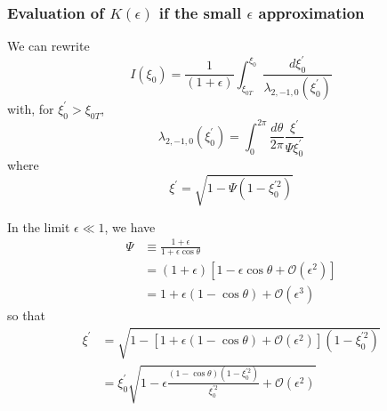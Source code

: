 
\subsubsection{Evaluation of $K\left( \epsilon \right) $ if the small $%
\epsilon $ approximation}\label{efftrappedfrac}

We can rewrite
\begin{equation}
I\left( \xi_{0}\right) =\frac{1}{\left( 1+\epsilon\right) }%
\int_{\xi_{0T}}^{\xi_{0}}\frac{d\xi_{0}^{\prime}}{\lambda_{2,-1,0}\left(
\xi_{0}^{\prime }\right) }
\end{equation}
with, for $\xi_{0}^{\prime}>\xi_{0T}$,
\begin{equation}
\lambda_{2,-1,0}\left( \xi_{0}^{\prime}\right) =\int_{0}^{2\pi}\frac
{d\theta}{2\pi}\frac{\xi^{\prime}}{\Psi\xi_{0}^{\prime}}
\end{equation}
where
\begin{equation}
\xi^{\prime}=\sqrt{1-\Psi\left( 1-\xi_{0}^{\prime2}\right) }
\end{equation}

In the limit $\epsilon\ll1$, we have
\begin{align}
\Psi & \equiv\frac{1+\epsilon}{1+\epsilon\cos\theta}  \nonumber \\
& =\left( 1+\epsilon\right) \left[ 1-\epsilon\cos\theta+\mathcal{O}\left(
\epsilon^{2}\right) \right]  \nonumber \\
& =1+\epsilon\left( 1-\cos\theta\right) +\mathcal{O}\left( \epsilon
^{3}\right)
\end{align}
so that
\begin{align*}
\xi^{\prime} & =\sqrt{1-\left[ 1+\epsilon\left( 1-\cos\theta\right) +%
\mathcal{O}\left( \epsilon^{2}\right) \right] \left( 1-\xi_{0}^{\prime
2}\right) } \\
& =\xi_{0}^{\prime}\sqrt{1-\epsilon\frac{\left( 1-\cos\theta\right) \left(
1-\xi_{0}^{\prime2}\right) }{\xi_{0}^{\prime2}}+\mathcal{O}\left(
\epsilon^{2}\right) }
\end{align*}

